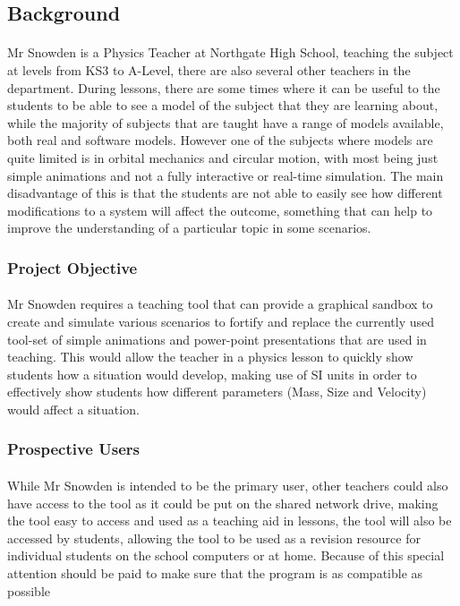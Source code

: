 \subsection{Background}
\paragraph{} 
Mr Snowden is a Physics Teacher at Northgate High School, teaching the subject at levels from KS3 to A-Level, there are also several other teachers in the department. During lessons, there are some times where it can be useful to the students to be able to see a model of the subject that they are learning about, while the majority of subjects that are taught have a range of models available, both real and software models. However one of the subjects where models are quite limited is in orbital mechanics and circular motion, with most being just simple animations and not a fully interactive or real-time simulation. The main disadvantage of this is that the students are not able to easily see how different modifications to a system will affect the outcome, something that can help to improve the understanding of a particular topic in some scenarios.

\subsubsection{Project Objective}
\paragraph{}
Mr Snowden requires a teaching tool that can provide a graphical sandbox to create and simulate various scenarios to fortify and replace the currently used tool-set of simple animations and power-point presentations that are used in teaching. This would allow the teacher in a physics lesson to quickly show students how a situation would develop, making use of SI units in order to effectively show students how different parameters (Mass, Size and Velocity) would affect a situation.

\subsubsection{Prospective Users}
\paragraph{}
While Mr Snowden is intended to be the primary user, other teachers could also have access to the tool as it could be put on the shared network drive, making the tool easy to access and used as a teaching aid in lessons, the tool will also be accessed by students, allowing the tool to be used as a revision resource for individual students on the school computers or at home. Because of this special attention should be paid to make sure that the program is as compatible as possible 

